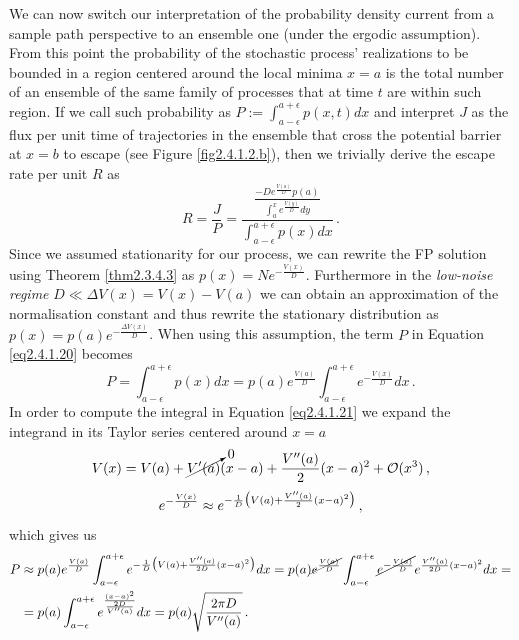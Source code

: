 \documentclass[../main.tex]{subfiles}
\begin{document}
We can now switch our interpretation of the probability density current from a sample path perspective to an ensemble one (under the ergodic assumption).
From this point the probability of the stochastic process' realizations to be bounded in a region centered around the local minima $x=a$ is the total number of an ensemble of the same family of processes that at time $t$ are within such region.
If we call such probability as $P:=\int_{a-\epsilon}^{a+\epsilon}p(x,t)dx$ and interpret $J$ as the flux per unit time of trajectories in the ensemble that cross the potential barrier at $x=b$ to escape (see Figure \ref{fig2.4.1.2.b}), then we trivially derive the escape rate per unit $R$ as
\begin{equation}\label{eq2.4.1.20}
     R = \frac{J}{P}=\frac{\frac{-De^{\frac{V(a)}{D}}p(a)}{\int_{a}^{x}e^{\frac{V(y)}{D}}dy}}{\int_{a-\epsilon}^{a+\epsilon}p(x)dx}\,.
\end{equation}
Since we assumed stationarity for our process, we can rewrite the FP solution using Theorem \ref{thm2.3.4.3} as $p(x)=N e^{-\frac{V(x)}{D}}$.
Furthermore in the \textit{low-noise regime} $D\ll\Delta V(x) = V(x)-V(a)$ we can obtain an approximation of the normalisation constant and thus rewrite the stationary distribution as $p(x)=p(a)e^{-\frac{\Delta V(x)}{D}}$.
When using this assumption, the term $P$ in Equation \eqref{eq2.4.1.20} becomes
\begin{equation}\label{eq2.4.1.21}
     P=\int_{a-\epsilon}^{a+\epsilon}p(x)dx=p(a)e^{\frac{V(a)}{D}}\int_{a-\epsilon}^{a+\epsilon}e^{-\frac{V(x)}{D}}dx\,.
\end{equation}
In order to compute the integral in Equation \eqref{eq2.4.1.21} we expand the integrand in its Taylor series centered around $x=a$
\begin{equation*}
        V(x) = V(a)+\cancelto{0}{V'(a)}(x-a)+\frac{V''(a)}{2}(x-a)^{2}+\mathcal{O}(x^{3})\,,
\end{equation*}
\begin{equation*}
        e^{-\frac{V(x)}{D}} \approx e^{-\frac{1}{D}\big(V(a)+\frac{V''(a)}{2}(x-a)^{2}\big)}\,, 
\end{equation*}
which gives us
\begin{align}
        P &\approx p(a)e^{\frac{V(a)}{D}}\int_{a-\epsilon}^{a+\epsilon}e^{-\frac{1}{D}\big(V(a)+\frac{V''(a)}{2D}(x-a)^{2}\big)}dx = p(a)\cancel{e^{\frac{V(a)}{D}}}\int_{a-\epsilon}^{a+\epsilon}\cancel{e^{-\frac{V(a)}{D}}}e^{\frac{V''(a)}{2D}(x-a)^{2}}dx = \nonumber \\
          &= p(a)\int_{a-\epsilon}^{a+\epsilon}e^{\frac{(x-a)^{2}}{\frac{2D}{V''(a)}}}dx =p(a)\sqrt{\frac{2\pi D}{V''(a)}} \,. \label{eq2.4.1.22}
\end{align}
\end{document}

